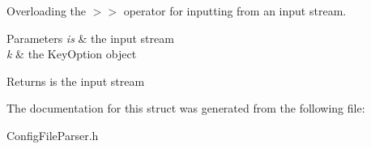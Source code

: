 Overloading the $>$$>$ operator for inputting from an input stream. 


\begin{DoxyParams}{Parameters}
{\em is} & the input stream \\
\hline
{\em k} & the Key\+Option object \\
\hline
\end{DoxyParams}
\begin{DoxyReturn}{Returns}
is the input stream 
\end{DoxyReturn}


The documentation for this struct was generated from the following file\+:\begin{DoxyCompactItemize}
\item 
Config\+File\+Parser.\+h\end{DoxyCompactItemize}
